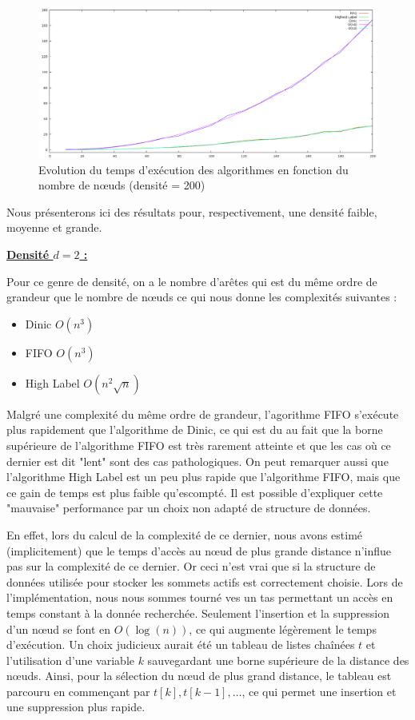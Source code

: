 \begin{figure}
\begin{center}
\includegraphics[scale=0.6]{../data_struct/results/ratio200b.png}
\end{center}
\caption{Evolution du temps d'exécution des algorithmes en fonction du nombre de n\oe uds (densité =
200)}
\label{d200}
\end{figure}

Nous présenterons ici des résultats pour, respectivement, une densité faible, moyenne et grande.

\textbf{\underline{Densité $d = 2$ :}}

Pour ce genre de densité, on a le nombre d'arêtes qui est du même ordre de grandeur que le nombre de
n\oe uds ce qui nous donne les complexités suivantes :
\begin{itemize}
\item Dinic $O(n^3)$
\item FIFO $O(n^3)$
\item High Label $O(n^2\sqrt{n})$
\end{itemize}

Malgré une complexité du même ordre de grandeur, l'agorithme FIFO s'exécute plus rapidement que
l'algorithme de Dinic, ce qui est du au fait que la borne supérieure de l'algorithme FIFO est très
rarement atteinte et que les cas où ce dernier est dit "lent" sont des cas pathologiques. On peut
remarquer aussi que l'algorithme High Label est un peu plus rapide que l'algorithme FIFO, mais que
ce gain de temps est plus faible qu'escompté. Il est possible d'expliquer cette "mauvaise"
performance par un choix non adapté de structure de données.

En effet, lors du calcul de la complexité de ce dernier, nous avons estimé (implicitement) que le
temps d'accès au n\oe ud de plus grande distance n'influe pas sur la complexité de ce dernier. Or
ceci n'est vrai que si la structure de données utilisée pour stocker les sommets actifs est
correctement choisie. Lors de l'implémentation, nous nous sommes tourné ves un tas permettant un
accès en temps constant à la donnée recherchée. Seulement l'insertion et la suppression d'un n\oe ud
se font en $O(\log(n))$, ce qui augmente légèrement le temps d'exécution. Un choix judicieux aurait
été un tableau de listes chaînées $t$ et l'utilisation d'une variable $k$ sauvegardant une borne
supérieure de la distance des n\oe uds. Ainsi, pour la sélection du n\oe ud de plus grand distance,
le tableau est parcouru en commençant par $t[k], t[k-1], \dots$, ce qui permet une insertion et une
suppression plus rapide.
